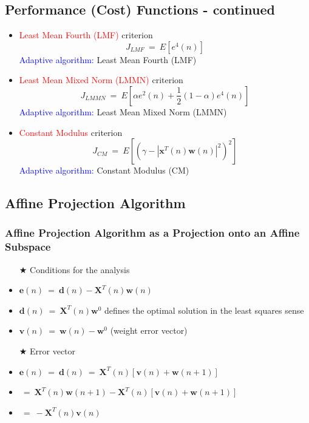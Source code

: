 \documentclass[12pt,hyperref=true,mathserif]{beamer}
\begin{document}
\subsection{Performance (Cost) Functions - continued}
\begin{frame}
\begin{itemize}
  \item \textcolor{red}{Least Mean Fourth (LMF)} criterion
  \begin{equation}\label{equ:LeastMF}
    J_{LMF}~=~E[e^{4}(n)]
  \end{equation}
  \textcolor{blue}{Adaptive algorithm:} Least Mean Fourth (LMF)
  \item \textcolor{red}{Least Mean Mixed Norm (LMMN)} criterion
  \begin{equation}\label{equ:LeastMMN}
    J_{LMMN}~=~E[\alpha e^{2}(n)+\frac{1}{2}(1-\alpha)e^{4}(n)]
  \end{equation}
  \textcolor{blue}{Adaptive algorithm:} Least Mean Mixed Norm (LMMN)
  \item \textcolor{red}{Constant Modulus} criterion
  \begin{equation}\label{equ:ConstantM}
    J_{CM}~=~E[(\gamma-|\mathbf{x}^{T}(n)\mathbf{w}(n)|^{2})^{2}]
  \end{equation}
  \textcolor{blue}{Adaptive algorithm:} Constant Modulus (CM)
\end{itemize}
\end{frame}

\subsection{Affine Projection Algorithm}
\begin{frame}
\frametitle{Affine Projection Algorithm as a Projection onto an Affine Subspace}
\begin{itemize}
  \item[$\bigstar$] Conditions for the analysis
  \item \quad$\mathbf{e}(n)~=~\mathbf{d}(n)-\mathbf{X}^{T}(n)\mathbf{w}(n)$
  \item \quad$\mathbf{d}(n)~=~\mathbf{X}^{T}(n)\mathbf{w}^{0}$ defines the optimal solution in the least squares sense
  \item \quad$\mathbf{v}(n)~=~\mathbf{w}(n)-\mathbf{w}^{0}$ (weight error vector)
  \item[$\bigstar$] Error vector
  \item \quad$\mathbf{e}(n) ~=~ \mathbf{d}(n)~=~\mathbf{X}^{T}(n)[\mathbf{v}(n)+\mathbf{w}(n+1)]$
  \item \qquad\quad$~=~\mathbf{X}^{T}(n)\mathbf{w}(n+1) - \mathbf{X}^{T}(n)[\mathbf{v}(n)+\mathbf{w}(n+1)]$
  \item \qquad\quad$~=~-\mathbf{X}^{T}(n)\mathbf{v}(n)$
\end{itemize}
\end{frame}
\end{document}
